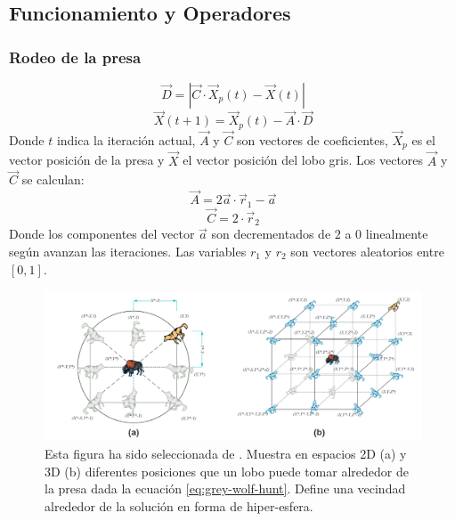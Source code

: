 \subsection{Funcionamiento y Operadores}

\subsubsection{Rodeo de la presa}
\begin{equation}
    \vec{D}=|\vec{C}\cdot\vec{X}_p(t)-\vec{X}(t)|
\end{equation}
\begin{equation}
    \vec{X}(t+1)=\vec{X}_p(t)-\vec{A}\cdot\vec{D}
    \label{eq:grey-wolf-hunt}
\end{equation}
Donde $t$ indica la iteración actual, $\vec{A}$ y $\vec{C}$ son vectores de coeficientes, $\vec{X}_p$ es el vector posición de la presa y $\vec{X}$ el vector posición del lobo gris.
Los vectores $\vec{A}$ y $\vec{C}$ se calculan:
\begin{equation}
    \vec{A}=2\vec{a}\cdot\vec{r}_1-\vec{a}
\end{equation}
\begin{equation}
    \vec{C}=2\cdot\vec{r}_2
\end{equation}
Donde los componentes del vector $\vec{a}$ son decrementados de $2$ a $0$ linealmente según avanzan las iteraciones. Las variables  $r_1$ y $r_2$ son vectores aleatorios entre $[0,1]$.

\begin{figure}[H]
    \begin{center}
        \includegraphics[width=1\textwidth]{imagenes/grey-wolf-hunt.png}
    \end{center}
    \caption[Rodeo de la presa en 2D y 3D]{Esta figura ha sido seleccionada de \cite{mirjalili_grey_2014}. Muestra en espacios 2D (a) y 3D (b) diferentes posiciones que un lobo puede tomar alrededor de la presa dada la ecuación \ref{eq:grey-wolf-hunt}. Define una vecindad alrededor de la solución en forma de hiper-esfera.}
\end{figure}

